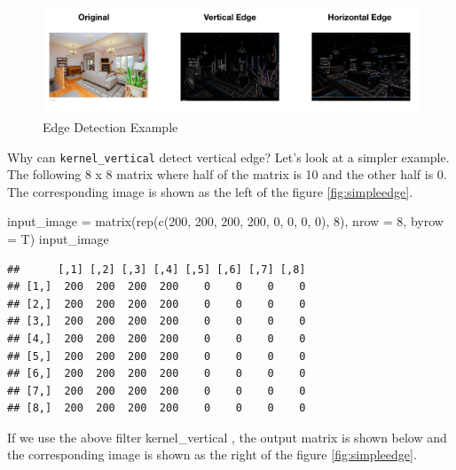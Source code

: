 \documentclass[
  12pt,
]{krantz}
\makeatletter
\newenvironment{Shaded}{\begin{snugshade}}{\end{snugshade}}
\newcommand{\AttributeTok}[1]{\textcolor[rgb]{0.61,0.61,0.61}{#1}}
\newcommand{\DecValTok}[1]{\textcolor[rgb]{0.06,0.06,0.06}{#1}}
\newcommand{\FunctionTok}[1]{\textcolor[rgb]{0,0,0}{#1}}
\newcommand{\NormalTok}[1]{#1}
\newcommand{\OtherTok}[1]{\textcolor[rgb]{0.37,0.37,0.37}{#1}}
\newenvironment{kframe}{%
\medskip{}
\setlength{\fboxsep}{.8em}
 \def\at@end@of@kframe{}%
 \ifinner\ifhmode%
  \def\at@end@of@kframe{\end{minipage}}%
  \begin{minipage}{\columnwidth}%
 \fi\fi%
 \def\FrameCommand##1{\hskip\@totalleftmargin \hskip-\fboxsep
 \colorbox{shadecolor}{##1}\hskip-\fboxsep
     \hskip-\linewidth \hskip-\@totalleftmargin \hskip\columnwidth}%
 \MakeFramed {\advance\hsize-\width
   \@totalleftmargin\z@ \linewidth\hsize
   \@setminipage}}%
 {\par\unskip\endMakeFramed%
 \at@end@of@kframe}
\renewenvironment{Shaded}{\begin{kframe}}{\end{kframe}}
\makeatother
\begin{document}
\begin{figure}

{\centering \includegraphics[width=1\linewidth]{images/edgedet5} 

}

\caption{Edge Detection Example}\label{fig:edgedetection}
\end{figure}

Why can \texttt{kernel\_vertical} detect vertical edge? Let's look at a simpler example. The following 8 x 8 matrix where half of the matrix is 10 and the other half is 0. The corresponding image is shown as the left of the figure \ref{fig:simpleedge}.

\begin{Shaded}
\begin{Highlighting}[]
\NormalTok{input\_image }\OtherTok{=} \FunctionTok{matrix}\NormalTok{(}\FunctionTok{rep}\NormalTok{(}\FunctionTok{c}\NormalTok{(}\DecValTok{200}\NormalTok{, }\DecValTok{200}\NormalTok{, }\DecValTok{200}\NormalTok{, }\DecValTok{200}\NormalTok{, }\DecValTok{0}\NormalTok{, }\DecValTok{0}\NormalTok{, }\DecValTok{0}\NormalTok{, }\DecValTok{0}\NormalTok{), }\DecValTok{8}\NormalTok{),}
                     \AttributeTok{nrow =} \DecValTok{8}\NormalTok{, }\AttributeTok{byrow =}\NormalTok{ T)}
\NormalTok{input\_image}
\end{Highlighting}
\end{Shaded}

\begin{verbatim}
##      [,1] [,2] [,3] [,4] [,5] [,6] [,7] [,8]
## [1,]  200  200  200  200    0    0    0    0
## [2,]  200  200  200  200    0    0    0    0
## [3,]  200  200  200  200    0    0    0    0
## [4,]  200  200  200  200    0    0    0    0
## [5,]  200  200  200  200    0    0    0    0
## [6,]  200  200  200  200    0    0    0    0
## [7,]  200  200  200  200    0    0    0    0
## [8,]  200  200  200  200    0    0    0    0
\end{verbatim}

If we use the above filter kernel\_vertical , the output matrix is shown below and the corresponding image is shown as the right of the figure \ref{fig:simpleedge}.
\end{document}
